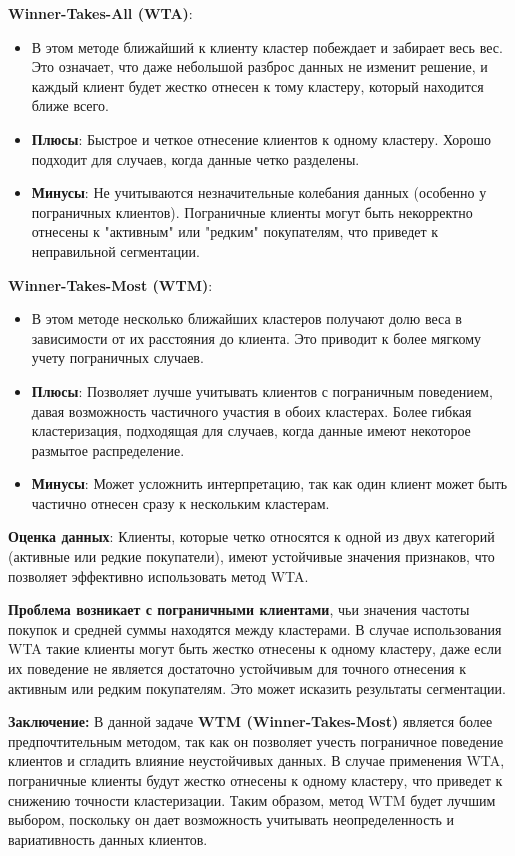 \begin{itemize}
\textbf{Winner-Takes-All (WTA)}:
\begin{itemize}
    \item В этом методе ближайший к клиенту кластер побеждает и забирает весь вес. Это означает, что даже небольшой разброс данных не изменит решение, и каждый клиент будет жестко отнесен к тому кластеру, который находится ближе всего.
    \item \textbf{Плюсы}: Быстрое и четкое отнесение клиентов к одному кластеру. Хорошо подходит для случаев, когда данные четко разделены.
    \item \textbf{Минусы}: Не учитываются незначительные колебания данных (особенно у пограничных клиентов). Пограничные клиенты могут быть некорректно отнесены к "активным" или "редким" покупателям, что приведет к неправильной сегментации.
\end{itemize}

\textbf{Winner-Takes-Most (WTM)}:
\begin{itemize}
    \item В этом методе несколько ближайших кластеров получают долю веса в зависимости от их расстояния до клиента. Это приводит к более мягкому учету пограничных случаев.
    \item \textbf{Плюсы}: Позволяет лучше учитывать клиентов с пограничным поведением, давая возможность частичного участия в обоих кластерах. Более гибкая кластеризация, подходящая для случаев, когда данные имеют некоторое размытое распределение.
    \item \textbf{Минусы}: Может усложнить интерпретацию, так как один клиент может быть частично отнесен сразу к нескольким кластерам.
\end{itemize}

\textbf{Оценка данных}: 
Клиенты, которые четко относятся к одной из двух категорий (активные или редкие покупатели), имеют устойчивые значения признаков, что позволяет эффективно использовать метод WTA. 

\textbf{Проблема возникает с пограничными клиентами}, чьи значения частоты покупок и средней суммы находятся между кластерами. В случае использования WTA такие клиенты могут быть жестко отнесены к одному кластеру, даже если их поведение не является достаточно устойчивым для точного отнесения к активным или редким покупателям. Это может исказить результаты сегментации.

\textbf{Заключение:}
В данной задаче \textbf{WTM (Winner-Takes-Most)} является более предпочтительным методом, так как он позволяет учесть пограничное поведение клиентов и сгладить влияние неустойчивых данных. В случае применения WTA, пограничные клиенты будут жестко отнесены к одному кластеру, что приведет к снижению точности кластеризации. Таким образом, метод WTM будет лучшим выбором, поскольку он дает возможность учитывать неопределенность и вариативность данных клиентов.


\end{itemize}
